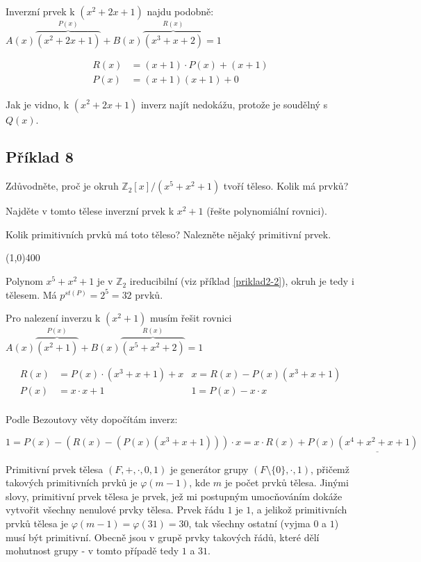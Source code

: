 \documentclass{article}
\begin{document}
Inverzní prvek k $(x^2 + 2x + 1)$ najdu podobně: $A(x)\overbrace{(x^2 + 2x + 1)}^{P(x)} + B(x)\overbrace{(x^3 + x + 2)}^{R(x)} = 1$

\begin{align*}
R(x) 	& = (x+1)\cdot P(x) + (x+1) \\
P(x) & = (x+1)(x+1) + 0 
\end{align*}

Jak je vidno, k $(x^2 + 2x + 1)$ inverz najít nedokážu, protože je soudělný s $Q(x)$.

\subsection{\label{priklad2-8}Příklad 8}
Zdůvodněte, proč je okruh $\mathbb{Z}_2[x]/(x^5 + x^2 + 1)$ tvoří těleso. Kolik má prvků?

Najděte v tomto tělese inverzní prvek k $x^2 + 1$ (řešte polynomiální rovnici).

Kolik primitivních prvků má toto těleso? Nalezněte nějaký primitivní prvek.

\line(1,0){400}

Polynom $x^5 + x^2 + 1$ je v $\mathbb{Z}_2$ ireducibilní (viz příklad \ref{priklad2-2}), okruh je tedy i tělesem. Má $p^{st(P)} = 2^5 = 32$ prvků. 

Pro nalezení inverzu k $(x^2 + 1)$ musím řešit rovnici $A(x)\overbrace{(x^2 + 1)}^{P(x)} + B(x)\overbrace{(x^5 + x^2 + 2)}^{R(x)} = 1$

\begin{align*}
R(x) 	& = P(x)\cdot(x^3 + x + 1) + x 	& x = R(x) - P(x)(x^3+x+1) \\
P(x)	& = x\cdot x + 1  							& 1 = P(x) - x\cdot x \\
\end{align*}

Podle Bezoutovy věty dopočítám inverz:

\[ 1 = P(x) - (R(x) - (P(x)(x^3 + x + 1)))\cdot x = x\cdot R(x) + P(x)\underline{(x^4 + x^2 + x + 1)} \]

Primitivní prvek tělesa $(F,+,\cdot,0,1)$ je generátor grupy $(F \setminus \{0\},\cdot,1)$, přičemž takových primitivních prvků je $\varphi(m - 1)$, kde $m$ je počet prvků tělesa. Jinými slovy, primitivní prvek tělesa je prvek, jež mi postupným umocňováním dokáže vytvořit všechny nenulové prvky tělesa. Prvek řádu $1$ je $1$, a jelikož primitivních prvků tělesa je $\varphi(m - 1) = \varphi(31) = 30$, tak všechny ostatní (vyjma $0$ a $1$) musí být primitivní. Obecně jsou v grupě prvky takových řádů, které dělí mohutnost grupy - v tomto případě tedy $1$ a $31$. 
\end{document}
